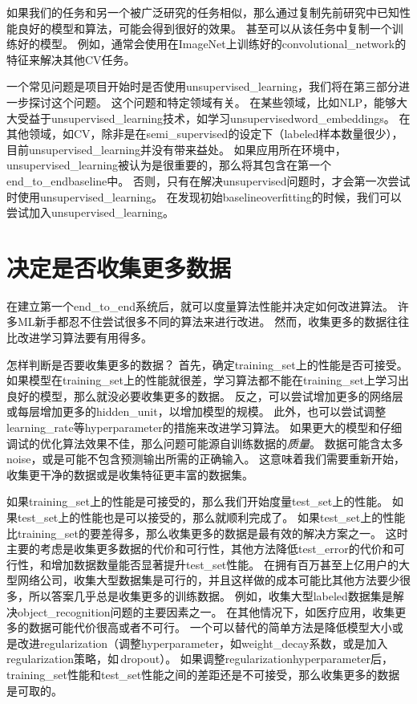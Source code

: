 如果我们的任务和另一个被广泛研究的任务相似，那么通过复制先前研究中已知性能良好的模型和算法，可能会得到很好的效果。
甚至可以从该任务中复制一个训练好的模型。
例如，通常会使用在ImageNet上训练好的\gls{convolutional_network}的特征来解决其他\gls{CV}任务\citep{girshickregion}。


一个常见问题是项目开始时是否使用\gls{unsupervised_learning}，我们将在第三部分进一步探讨这个问题。
 这个问题和特定领域有关。
在某些领域，比如\gls{NLP}，能够大大受益于\gls{unsupervised_learning}技术，如学习\gls{unsupervised}\gls{word_embeddings}。
在其他领域，如\gls{CV}，除非是在\gls{semi_supervised}的设定下（\gls{labeled}样本数量很少）\citep{Kingma-et-al-NIPS2014,Rasmus-et-al-arxiv2015}，目前\gls{unsupervised_learning}并没有带来益处。
如果应用所在环境中，\gls{unsupervised_learning}被认为是很重要的，那么将其包含在第一个\gls{end_to_end}\gls{baseline}中。
否则，只有在解决\gls{unsupervised}问题时，才会第一次尝试时使用\gls{unsupervised_learning}。
在发现初始\gls{baseline}\gls{overfitting}的时候，我们可以尝试加入\gls{unsupervised_learning}。


\section{决定是否收集更多数据}
\label{sec:determining_whether_to_gather_more_data}

在建立第一个\gls{end_to_end}系统后，就可以度量算法性能并决定如何改进算法。
许多\gls{ML}新手都忍不住尝试很多不同的算法来进行改进。
然而，收集更多的数据往往比改进学习算法要有用得多。


怎样判断是否要收集更多的数据？
首先，确定\gls{training_set}上的性能是否可接受。
如果模型在\gls{training_set}上的性能就很差，学习算法都不能在\gls{training_set}上学习出良好的模型，那么就没必要收集更多的数据。
反之，可以尝试增加更多的网络层或每层增加更多的\gls{hidden_unit}，以增加模型的规模。
此外，也可以尝试调整\gls{learning_rate}等\gls{hyperparameter}的措施来改进学习算法。
如果更大的模型和仔细调试的优化算法效果不佳，那么问题可能源自训练数据的\emph{质量}。
数据可能含太多\gls{noise}，或是可能不包含预测输出所需的正确输入。
这意味着我们需要重新开始，收集更干净的数据或是收集特征更丰富的数据集。


如果\gls{training_set}上的性能是可接受的，那么我们开始度量\gls{test_set}上的性能。
如果\gls{test_set}上的性能也是可以接受的，那么就顺利完成了。
如果\gls{test_set}上的性能比\gls{training_set}的要差得多，那么收集更多的数据是最有效的解决方案之一。
这时主要的考虑是收集更多数据的代价和可行性，其他方法降低\gls{test_error}的代价和可行性，和增加数据数量能否显著提升\gls{test_set}性能。
在拥有百万甚至上亿用户的大型网络公司，收集大型数据集是可行的，并且这样做的成本可能比其他方法要少很多，所以答案几乎总是收集更多的训练数据。
例如，收集大型\gls{labeled}数据集是解决\gls{object_recognition}问题的主要因素之一。
在其他情况下，如医疗应用，收集更多的数据可能代价很高或者不可行。
一个可以替代的简单方法是降低模型大小或是改进\gls{regularization}（调整\gls{hyperparameter}，如\gls{weight_decay}系数，或是加入\gls{regularization}策略，如\,\gls{dropout}）。
如果调整\gls{regularization}\gls{hyperparameter}后，\gls{training_set}性能和\gls{test_set}性能之间的差距还是不可接受，那么收集更多的数据是可取的。


